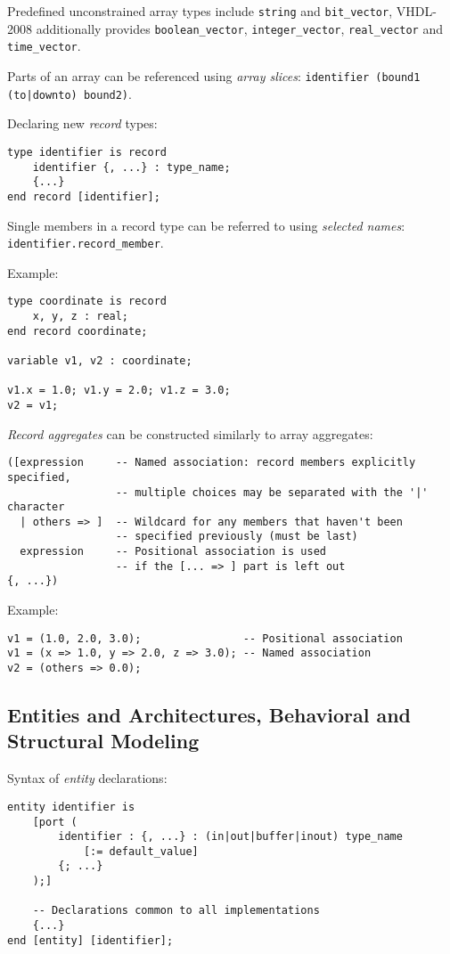 \documentclass[fontsize=11pt,a4paper]{scrartcl}
\begin{document}
Predefined unconstrained array types include \lstinline!string! and \lstinline!bit_vector!, VHDL-2008 additionally provides \lstinline!boolean_vector!, \lstinline!integer_vector!, \lstinline!real_vector! and \lstinline!time_vector!.

Parts of an array can be referenced using \emph{array slices}: \lstinline!identifier (bound1 (to|downto) bound2)!.

Declaring new \emph{record} types:
\begin{lstlisting}
type identifier is record
	identifier {, ...} : type_name;
	{...}
end record [identifier];
\end{lstlisting}

Single members in a record type can be referred to using \emph{selected names}: \lstinline!identifier.record_member!.

Example:
\begin{lstlisting}
type coordinate is record
	x, y, z : real;
end record coordinate;

variable v1, v2 : coordinate;

v1.x = 1.0; v1.y = 2.0; v1.z = 3.0;
v2 = v1;
\end{lstlisting}

\emph{Record aggregates} can be constructed similarly to array aggregates:
\begin{lstlisting}
([expression     -- Named association: record members explicitly specified,
                 -- multiple choices may be separated with the '|' character
  | others => ]  -- Wildcard for any members that haven't been
                 -- specified previously (must be last)
  expression     -- Positional association is used
                 -- if the [... => ] part is left out
{, ...})
\end{lstlisting}

Example:
\begin{lstlisting}
v1 = (1.0, 2.0, 3.0);                -- Positional association
v1 = (x => 1.0, y => 2.0, z => 3.0); -- Named association
v2 = (others => 0.0);
\end{lstlisting}
%
%
%
%
\newpage
\subsection{Entities and Architectures, Behavioral and Structural Modeling}
Syntax of \emph{entity} declarations:
\begin{lstlisting}
entity identifier is
	[port (
		identifier : {, ...} : (in|out|buffer|inout) type_name
			[:= default_value]
		{; ...}
	);]

	-- Declarations common to all implementations
	{...}
end [entity] [identifier];
\end{lstlisting}
\end{document}
